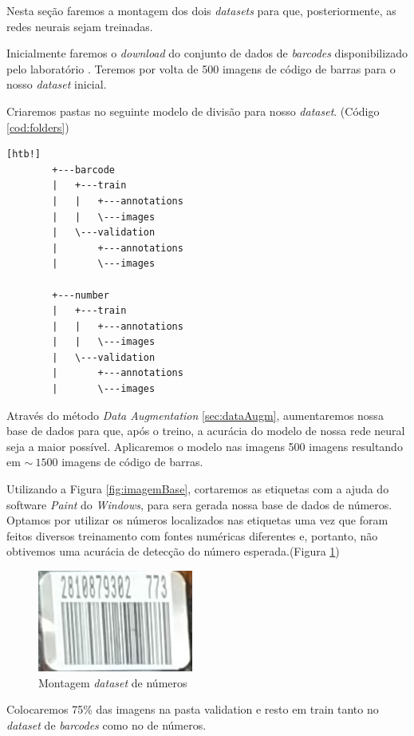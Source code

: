 Nesta seção faremos a montagem dos dois \textit{datasets} para que, posteriormente, as redes neurais sejam treinadas. 

Inicialmente faremos o \textit{download} do conjunto de dados de \textit{barcodes} disponibilizado pelo laboratório \citeauthor{Arte-Lab}. Teremos por volta de 500 imagens de código de barras para o nosso \textit{dataset} inicial.

Criaremos pastas no seguinte modelo de divisão para nosso \textit{dataset}. (Código \ref{cod:folders})
\begin{lstlisting}[caption=Divisão dos arquivos para dataset, label=cod:folders][htb!]
        +---barcode
        |   +---train
        |   |   +---annotations
        |   |   \---images
        |   \---validation
        |       +---annotations
        |       \---images
        
        +---number
        |   +---train
        |   |   +---annotations
        |   |   \---images
        |   \---validation
        |       +---annotations
        |       \---images
\end{lstlisting}

Através do método \textit{Data Augmentation} \ref{sec:dataAugm}, aumentaremos nossa base de dados para que, após o treino, a acurácia do modelo de nossa rede neural seja a maior possível. Aplicaremos o modelo nas imagens 500 imagens resultando em $\sim~1500$ imagens de código de barras.

Utilizando a Figura \ref{fig:imagemBase}, cortaremos as etiquetas com a ajuda do software \textit{Paint} do \textit{Windows}, para sera gerada nossa base de dados de números. Optamos por utilizar os números localizados nas etiquetas uma vez que foram feitos diversos treinamento com fontes numéricas diferentes e, portanto, não obtivemos uma acurácia de detecção do número esperada.(Figura \ref{fig:barcodeDataset})

\begin{figure}[htbp]
	\centering
	\includegraphics[width=0.25\linewidth]{figuras/MachineLearning/barcodeDataset.png}
	\caption{Montagem \textit{dataset} de números}
	\label{fig:barcodeDataset}
\end{figure}

Colocaremos 75\% das imagens na pasta validation e resto em train tanto no \textit{dataset} de \textit{barcodes} como no de números.

